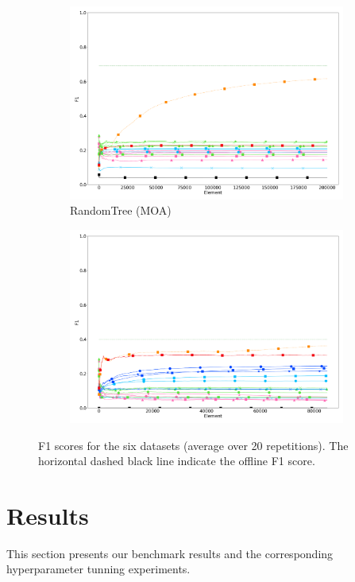 \begin{figure}
\begin{subfigure}[t]{.49\linewidth}
		\includegraphics[width=\linewidth]{figures/results/dataset_3_f1.png}
		\caption{RandomTree (MOA)}
		\label{fig:f1-dataset_3}
	\end{subfigure}
	\begin{subfigure}[t]{.49\linewidth}
		\includegraphics[width=\linewidth]{figures/results/recofit_6_f1.png}
		\caption{\recofitdataset}
		\label{fig:f1-recofit}
	\end{subfigure}
	\caption{F1 scores for the six datasets (average over 20 repetitions). The
		horizontal dashed black line indicate the offline \knn F1 score.}
	\label{fig:f1}
\end{figure}

\section{Results}
This section presents our benchmark results and the corresponding
hyperparameter tunning experiments.


